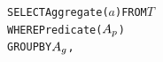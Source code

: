 \begin{alltt}
SELECT Aggregate(\(a\)) FROM \(T\)
WHERE Predicate(\(A\sb{p}\))
GROUP BY \(A\sb{g}\),
\end{alltt}

\fi













